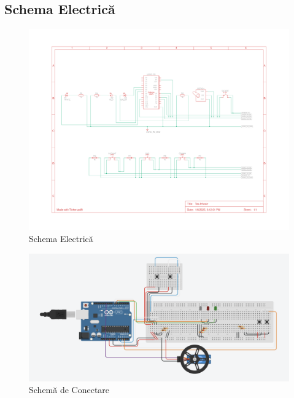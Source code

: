     \subsection{Schema Electrică}

    \begin{figure}[ht!]
      \centering
      \includegraphics[width=\textwidth]{figures/Schematic.pdf} %
      \caption{Schema Electrică}
      \label{fig:fig1}
    \end{figure}

    \begin{figure}[ht!]
      \centering
      \includegraphics[width=\textwidth]{figures/Circuit.png} %
      \caption{Schemă de Conectare}
      \label{fig:fig2}
    \end{figure}

